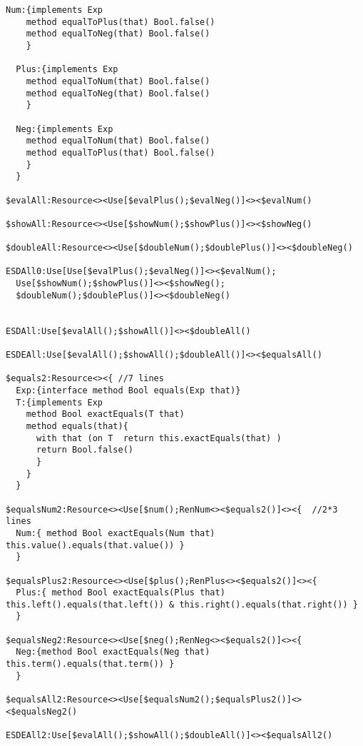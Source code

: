 \begin{lstlisting}[basicstyle=\tiny, mathescape=false]
  Num:{implements Exp
    method equalToPlus(that) Bool.false()
    method equalToNeg(that) Bool.false()
    }

  Plus:{implements Exp
    method equalToNum(that) Bool.false()
    method equalToNeg(that) Bool.false()
    }

  Neg:{implements Exp
    method equalToNum(that) Bool.false()
    method equalToPlus(that) Bool.false()
    }
  }

$evalAll:Resource<><Use[$evalPlus();$evalNeg()]<><$evalNum()

$showAll:Resource<><Use[$showNum();$showPlus()]<><$showNeg()

$doubleAll:Resource<><Use[$doubleNum();$doublePlus()]<><$doubleNeg()

ESDAll0:Use[Use[$evalPlus();$evalNeg()]<><$evalNum();
  Use[$showNum();$showPlus()]<><$showNeg();
  $doubleNum();$doublePlus()]<><$doubleNeg()


ESDAll:Use[$evalAll();$showAll()]<><$doubleAll()

ESDEAll:Use[$evalAll();$showAll();$doubleAll()]<><$equalsAll()

$equals2:Resource<><{ //7 lines
  Exp:{interface method Bool equals(Exp that)}
  T:{implements Exp
    method Bool exactEquals(T that)
    method equals(that){
      with that (on T  return this.exactEquals(that) )
      return Bool.false()
      }
    }
  }

$equalsNum2:Resource<><Use[$num();RenNum<><$equals2()]<><{  //2*3 lines
  Num:{ method Bool exactEquals(Num that) this.value().equals(that.value()) }
  }

$equalsPlus2:Resource<><Use[$plus();RenPlus<><$equals2()]<><{
  Plus:{ method Bool exactEquals(Plus that) this.left().equals(that.left()) & this.right().equals(that.right()) }
  }

$equalsNeg2:Resource<><Use[$neg();RenNeg<><$equals2()]<><{
  Neg:{method Bool exactEquals(Neg that) this.term().equals(that.term()) }
  }

$equalsAll2:Resource<><Use[$equalsNum2();$equalsPlus2()]<><$equalsNeg2()

ESDEAll2:Use[$evalAll();$showAll();$doubleAll()]<><$equalsAll2()

\end{lstlisting}
